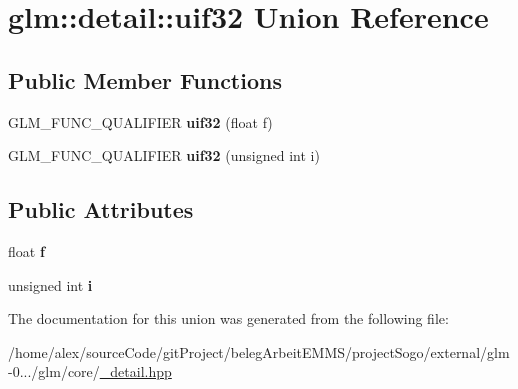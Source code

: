 \hypertarget{unionglm_1_1detail_1_1uif32}{\section{glm\-:\-:detail\-:\-:uif32 Union Reference}
\label{unionglm_1_1detail_1_1uif32}
}
\subsection*{Public Member Functions}
\begin{DoxyCompactItemize}
\item 
\hypertarget{unionglm_1_1detail_1_1uif32_ae86c2bd42a88f11e3217d14e46606971}{G\-L\-M\-\_\-\-F\-U\-N\-C\-\_\-\-Q\-U\-A\-L\-I\-F\-I\-E\-R {\bfseries uif32} (float f)}\label{unionglm_1_1detail_1_1uif32_ae86c2bd42a88f11e3217d14e46606971}

\item 
\hypertarget{unionglm_1_1detail_1_1uif32_af13a824828bd9601e53204ede38377da}{G\-L\-M\-\_\-\-F\-U\-N\-C\-\_\-\-Q\-U\-A\-L\-I\-F\-I\-E\-R {\bfseries uif32} (unsigned int i)}\label{unionglm_1_1detail_1_1uif32_af13a824828bd9601e53204ede38377da}

\end{DoxyCompactItemize}
\subsection*{Public Attributes}
\begin{DoxyCompactItemize}
\item 
\hypertarget{unionglm_1_1detail_1_1uif32_a5f697f84c5a8ec72c2f3a4f705f5bde8}{float {\bfseries f}}\label{unionglm_1_1detail_1_1uif32_a5f697f84c5a8ec72c2f3a4f705f5bde8}

\item 
\hypertarget{unionglm_1_1detail_1_1uif32_aff30e33bee63b0b9d1e930f0814da872}{unsigned int {\bfseries i}}\label{unionglm_1_1detail_1_1uif32_aff30e33bee63b0b9d1e930f0814da872}

\end{DoxyCompactItemize}


The documentation for this union was generated from the following file\-:\begin{DoxyCompactItemize}
\item 
/home/alex/source\-Code/git\-Project/beleg\-Arbeit\-E\-M\-M\-S/project\-Sogo/external/glm-\/0.../glm/core/\hyperlink{__detail_8hpp}{\-\_\-detail.\-hpp}\end{DoxyCompactItemize}
